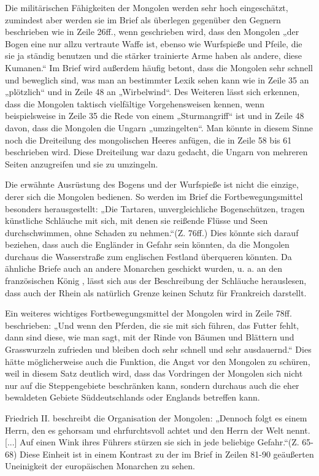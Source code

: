 \documentclass{../../sem_paper}
\begin{document}
Die militärischen Fähigkeiten der Mongolen werden sehr hoch eingeschätzt,
zumindest aber werden sie im Brief als überlegen gegenüber den Gegnern beschrieben
wie in Zeile 26ff., wenn geschrieben wird, dass den Mongolen „der Bogen eine nur
allzu vertraute Waffe ist, ebenso wie Wurfspieße und Pfeile, die sie ja ständig benutzen
und die stärker trainierte Arme haben als andere, diese Kumanen.“ Im Brief wird
außerdem häufig betont, dass die Mongolen sehr schnell und beweglich sind, was man
an bestimmter Lexik sehen kann wie in Zeile 35 an „plötzlich“ und in Zeile 48 an
„Wirbelwind“. Des Weiteren lässt sich erkennen, dass die Mongolen taktisch vielfältige
Vorgehensweisen kennen, wenn beispielsweise in Zeile 35 die Rede von einem
„Sturmangriff“ ist und in Zeile 48 davon, dass die Mongolen die Ungarn „umzingelten“.
Man könnte in diesem Sinne noch die Dreiteilung des mongolischen Heeres anfügen,
die in Zeile 58 bis 61 beschrieben wird. Diese Dreiteilung war dazu gedacht, die Ungarn
von mehreren Seiten anzugreifen und sie zu umzingeln.

Die erwähnte Ausrüstung des Bogens und der Wurfspieße ist nicht die einzige, derer
sich die Mongolen bedienen. So werden im Brief die Fortbewegungsmittel besonders
herausgestellt: „Die Tartaren, unvergleichliche Bogenschützen, tragen künstliche
Schläuche mit sich, mit denen sie reißende Flüsse und Seen durchschwimmen, ohne
Schaden zu nehmen.“(Z. 76ff.) Dies könnte sich darauf beziehen, dass auch die
Engländer in Gefahr sein könnten, da die Mongolen durchaus die Wasserstraße zum
englischen Festland überqueren könnten. Da ähnliche Briefe auch an andere Monarchen
geschickt wurden, u. a. an den französischen König\autocite[519]{heinisch1977} , lässt sich aus der Beschreibung der
Schläuche herauslesen, dass auch der Rhein als natürlich Grenze keinen Schutz für
Frankreich darstellt.

Ein weiteres wichtiges Fortbewegungsmittel der Mongolen wird in Zeile 78ff.
beschrieben: „Und wenn den Pferden, die sie mit sich führen, das Futter fehlt, dann sind
diese, wie man sagt, mit der Rinde von Bäumen und Blättern und Grasswurzeln
zufrieden und bleiben doch sehr schnell und sehr ausdauernd.“ Dies hätte
möglicherweise auch die Funktion, die Angst vor den Mongolen zu schüren, weil in
diesem Satz deutlich wird, dass das Vordringen der Mongolen sich nicht nur auf die
Steppengebiete beschränken kann, sondern durchaus auch die eher bewaldeten Gebiete
Süddeutschlands oder Englands betreffen kann.

Friedrich II. beschreibt die Organisation der Mongolen:
„Dennoch folgt es einem Herrn, den es gehorsam und ehrfurchtsvoll achtet und den
Herrn der Welt nennt. [...] Auf einen Wink ihres Führers stürzen sie sich in jede
beliebige Gefahr.“(Z. 65-68) Diese Einheit ist in einem Kontrast zu der im Brief in
Zeilen 81-90 geäußerten Uneinigkeit der europäischen Monarchen zu sehen.\autocite[80]{bezzola1974}
\end{document}

